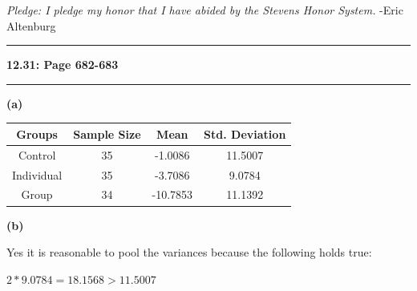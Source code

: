 \documentclass[11pt]{article}
\newcommand\question[2]{\vspace{.25in}\hrule\textbf{#1: #2}\vspace{.5em}\hrule\vspace{.10in}}
\renewcommand\part[1]{\vspace{.10in}\textbf{(#1)}\par}
\begin{document}
\raggedright
\newcommand\NAME{Eric Altenburg}  %
\newcommand\COURSE{MA-331}
\newcommand\HWNUM{6}              %


\textit{Pledge: I pledge my honor that I have abided by the Stevens Honor System.} -Eric Altenburg

\question{12.31}{Page 682-683}
	\part{a}
		\begin{tabular}{|c|c|c|c|}
			\hline
			Groups & Sample Size & Mean & Std. Deviation\\
			\hline
			Control & 35 & -1.0086 & 11.5007\\
			\hline
			Individual & 35 & -3.7086 & 9.0784\\
			\hline
			Group & 34 & -10.7853 & 11.1392\\
			\hline
		\end{tabular}
	
	\part{b}
		Yes it is reasonable to pool the variances because the following holds true:\par
		$2 * 9.0784 = 18.1568 > 11.5007$\par
\end{document}
